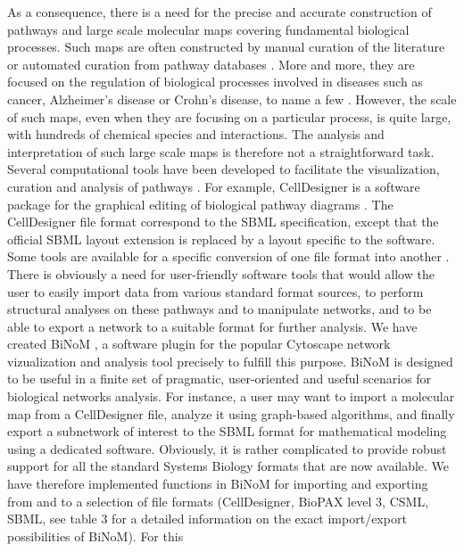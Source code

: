 \documentclass[10pt]{bmc_article}
\newenvironment{bmcformat}{\baselineskip20pt\sloppy\setboolean{publ}{false}}{\baselineskip20pt\sloppy}
\begin{document}
\begin{bmcformat}
As a consequence, there is a need for the precise and accurate construction of
pathways and large scale molecular maps covering fundamental biological
processes. Such maps are often constructed by manual curation of the literature or
automated curation from pathway databases \cite{bauer2009pathway}. More and more, they
are focused on the regulation of biological processes involved in diseases such
as cancer, Alzheimer's disease or Crohn's disease, to name a few \cite{oda2005comprehensive, oda2006comprehensive,
calzone2008comprehensive, caron2010comprehensive}. However, the scale of such
maps, even when they are focusing on a particular process, is quite large, with
hundreds of chemical species and interactions. The analysis and interpretation of such
large scale maps is therefore not a straightforward task. Several computational
tools have been developed to facilitate the visualization, curation and analysis
of pathways \cite{adriaens2008public}. For example, CellDesigner is a software package
for the graphical editing of biological pathway diagrams
\cite{funahashi2003celldesigner}. The CellDesigner file format correspond to the SBML specification, except that the official SBML layout extension is replaced by a layout specific to the software. Some tools are
available for a specific conversion of one file format into another
\cite{mi2011biopax, buchel2012qualitative}. There is obviously
a need for user-friendly software tools that would allow the user to easily
import data from various standard format sources, to perform structural analyses on these pathways
and to manipulate networks, and to be able to export a network to a suitable
format for further analysis. We have created
BiNoM \cite{zinovyev2008binom}, a software plugin for the popular Cytoscape
network vizualization and analysis tool \cite{cline2007integration} precisely to fulfill this purpose.
BiNoM is designed to be useful in a finite set of pragmatic, user-oriented and
useful scenarios for biological networks analysis. For instance, a user may want
to import a molecular map from a CellDesigner file, analyze it using graph-based
algorithms, and finally export a subnetwork of interest to the SBML format for
mathematical modeling using a dedicated software. Obviously, it is rather
complicated to provide robust support for all the standard Systems Biology
formats that are now available. We have therefore implemented functions in BiNoM
for importing and exporting from and to a selection of file formats
(CellDesigner, BioPAX level 3, CSML, SBML, see table 3 for a detailed
information on the exact import/export possibilities of BiNoM). For this

\end{bmcformat}
\end{document}
